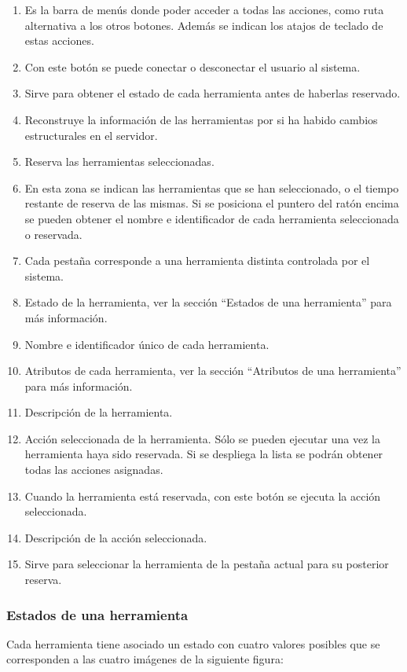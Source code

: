 \begin{enumerate}
\item Es la barra de menús donde poder acceder a todas las acciones, 
como ruta alternativa a los otros botones. Además se indican los 
atajos de teclado de estas acciones.
\item Con este botón se puede conectar o desconectar el usuario al 
sistema. 
\item Sirve para obtener el estado de cada herramienta antes de 
haberlas reservado.
\item Reconstruye la información de las herramientas por si ha habido 
cambios estructurales en el servidor.
\item Reserva las herramientas seleccionadas.
\item En esta zona se indican las herramientas que se han 
seleccionado, o el tiempo restante de reserva de las mismas. Si se 
posiciona el puntero del ratón encima se pueden obtener el nombre e 
identificador de cada herramienta seleccionada o reservada.
\item Cada pestaña corresponde a una herramienta distinta controlada 
por el sistema.
\item Estado de la herramienta, ver la sección ``Estados de una 
herramienta'' para más información.
\item Nombre e identificador único de cada herramienta.
\item Atributos de cada herramienta, ver la sección ``Atributos de una 
herramienta'' para más información.
\item Descripción de la herramienta.
\item Acción seleccionada de la herramienta. Sólo se pueden ejecutar 
una vez la herramienta haya sido reservada. Si se despliega la lista 
se podrán obtener todas las acciones asignadas.
\item Cuando la herramienta está reservada, con este botón se ejecuta 
la acción seleccionada.
\item Descripción de la acción seleccionada.
\item Sirve para seleccionar la herramienta de la pestaña actual para 
su posterior reserva.
\end{enumerate}

\subsubsection*{Estados de una herramienta}
Cada herramienta tiene asociado un estado con cuatro valores posibles 
que se corresponden a las cuatro imágenes de la siguiente figura:

